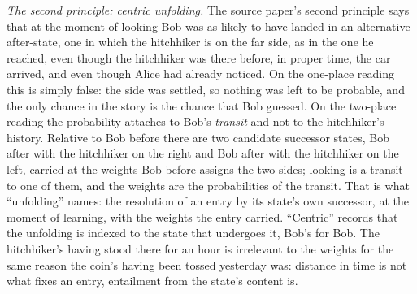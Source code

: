 \textit{The second principle: centric unfolding.} The source paper's second principle says that at the moment of looking Bob was as likely to have landed in an alternative after-state, one in which the hitchhiker is on the far side, as in the one he reached, even though the hitchhiker was there before, in proper time, the car arrived, and even though Alice had already noticed. On the one-place reading this is simply false: the side was settled, so nothing was left to be probable, and the only chance in the story is the chance that Bob guessed. On the two-place reading the probability attaches to Bob's \emph{transit} and not to the hitchhiker's history. Relative to Bob before there are two candidate successor states, Bob after with the hitchhiker on the right and Bob after with the hitchhiker on the left, carried at the weights Bob before assigns the two sides; looking is a transit to one of them, and the weights are the probabilities of the transit. That is what ``unfolding'' names: the resolution of an entry by its state's own successor, at the moment of learning, with the weights the entry carried. ``Centric'' records that the unfolding is indexed to the state that undergoes it, Bob's for Bob. The hitchhiker's having stood there for an hour is irrelevant to the weights for the same reason the coin's having been tossed yesterday was: distance in time is not what fixes an entry, entailment from the state's content is.


